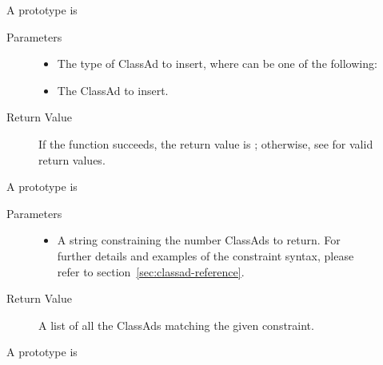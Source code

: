 
\begin{description}
\item []
  A prototype is 


  \begin{description}
    \item[ Parameters]
    \begin{itemize}
      \item {}
      The type of ClassAd to insert, where  can be one of the
      following:


      \item {} The ClassAd to insert.
    \end{itemize}
    \item[ Return Value]
      If the function succeeds, the return value is ; 
      otherwise, see  for valid return values.
  \end{description}

\item []
  A prototype is 


  \begin{description}
    \item[ Parameters]
    \begin{itemize}
      \item {} 
      A string constraining the number ClassAds to return. For further details 
      and examples of the constraint syntax, please refer to 
      section~\ref{sec:classad-reference}.
    \end{itemize}
    \item[ Return Value]
      A list of all the  ClassAds matching the 
      given constraint.
  \end{description}    

\item []
  A prototype is 


\end{description}
